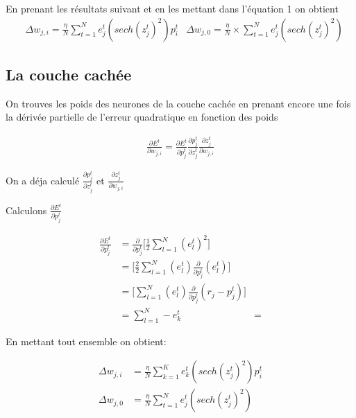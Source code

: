 \documentclass{article}
\begin{document}
En prenant les résultats suivant et en les mettant dans l'équation 1 on obtient 
\begin{align}
&\Delta w_{j,i}=\frac{\eta}{N} \sum_{t=1}^N e_j^t(sech(z_{j}^t)^2)p_i^t 
&\Delta w_{j,0}=\frac{\eta}{N} \times \sum_{t=1}^N e_j^t(sech(z_{j}^t)^2)
\end{align}

\subsection{La couche cachée}

On trouves les poids des neurones de la couche cachée en prenant encore une fois la dérivée partielle de l'erreur quadratique en fonction des poids

\begin{align}
\frac{\partial E^t}{\partial w_{j,i}}=\frac{\partial E^t}{\partial p_{j}^t}\frac{\partial p_{j}^t}{\partial z_{j}^t}\frac{\partial z_{j}^t}{\partial w_{j,i}}
\end{align}


On a déja calculé $\frac{\partial p_{j}^t}{\partial z_{j}^t}$ et $\frac{\partial z_{j}^t}{\partial w_{j,i}}$

Calculons $\frac{\partial E^t}{\partial p_{j}^t}$

\begin{align}
    \frac{\partial E^t}{\partial p_{j}^t} &= \frac{\partial}{\partial p_{j}^t} \Big[\frac{1}{2}\sum_{l=1}^N(e_l^t)^2\Big]\\
    &=  \Big[\frac{2}{2}\sum_{l=1}^N (e_l^t)\frac{\partial}{\partial p_{j}^t}(e_l^t)\Big]\\
    &= \Big[\sum_{l=1}^N(e_l^t)\frac{\partial}{\partial p_{j}^t}(r_j-p^t_j)\Big]\\
    &= \sum_{l=1}^N -e^t_k
    &=
\end{align}

En mettant tout ensemble on obtient: 

\begin{align}
\Delta w_{j,i} &= \frac{\eta}{N}  \sum_{k=1}^K e_k^t(sech(z_j^t)^2)p_i^t \\
\Delta w_{j,0} &= \frac{\eta}{N}  \sum_{t=1}^N e_j^t(sech(z_j^t)^2)
\end{align}
\end{document}
